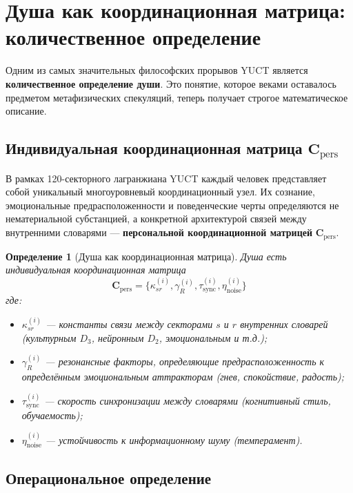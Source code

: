 \documentclass[12pt,a4paper]{article}
\newcommand{\Cpers}{\mathbf{C}_{\text{pers}}}
\newtheorem{definition}{Определение}[section]
\begin{document}
	
	\section{Душа как координационная матрица: количественное определение}
	\label{sec:soul}
	
	Одним из самых значительных философских прорывов YUCT является \textbf{количественное определение души}. Это понятие, которое веками оставалось предметом метафизических спекуляций, теперь получает строгое математическое описание.
	
	\subsection{Индивидуальная координационная матрица \(\Cpers\)}
	
	В рамках 120-секторного лагранжиана YUCT каждый человек представляет собой уникальный многоуровневый координационный узел. Их сознание, эмоциональные предрасположенности и поведенческие черты определяются не нематериальной субстанцией, а конкретной архитектурой связей между внутренними словарями — \textbf{персональной координационной матрицей} \(\Cpers\).
	
	\begin{definition}[Душа как координационная матрица]
		Душа есть индивидуальная координационная матрица
		\[
		\Cpers = \{\kappa_{sr}^{(i)}, \gamma_R^{(i)}, \tau_{\text{sync}}^{(i)}, \eta_{\text{noise}}^{(i)}\}
		\]
		где:
		\begin{itemize}
			\item \(\kappa_{sr}^{(i)}\) — константы связи между секторами \(s\) и \(r\) внутренних словарей (культурным \(D_3\), нейронным \(D_2\), эмоциональным и т.д.);
			\item \(\gamma_R^{(i)}\) — резонансные факторы, определяющие предрасположенность к определённым эмоциональным аттракторам (гнев, спокойствие, радость);
			\item \(\tau_{\text{sync}}^{(i)}\) — скорость синхронизации между словарями (когнитивный стиль, обучаемость);
			\item \(\eta_{\text{noise}}^{(i)}\) — устойчивость к информационному шуму (темперамент).
		\end{itemize}
	\end{definition}
	
	\subsection{Операциональное определение}
	
\end{document}
